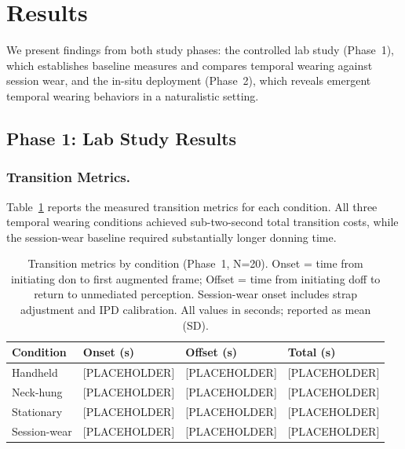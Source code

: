 
\section{Results}

We present findings from both study phases: the controlled lab study (Phase~1), which establishes baseline measures and compares temporal wearing against session wear, and the in-situ deployment (Phase~2), which reveals emergent temporal wearing behaviors in a naturalistic setting.

\subsection{Phase 1: Lab Study Results}

\subsubsection{Transition Metrics.}
Table~\ref{tab:lab-transition} reports the measured transition metrics for each condition. All three temporal wearing conditions achieved sub-two-second total transition costs, while the session-wear baseline required substantially longer donning time.

\begin{table}[t]
\centering
\caption{Transition metrics by condition (Phase~1, N=20). Onset = time from initiating don to first augmented frame; Offset = time from initiating doff to return to unmediated perception. Session-wear onset includes strap adjustment and IPD calibration. All values in seconds; reported as mean (SD).}
\label{tab:lab-transition}
\begin{tabular}{p{2.2cm} p{1.8cm} p{1.8cm} p{2cm}}
\toprule
\textbf{Condition} & \textbf{Onset (s)} & \textbf{Offset (s)} & \textbf{Total (s)} \\
\midrule
Handheld & [PLACEHOLDER] & [PLACEHOLDER] & [PLACEHOLDER] \\
Neck-hung & [PLACEHOLDER] & [PLACEHOLDER] & [PLACEHOLDER] \\
Stationary & [PLACEHOLDER] & [PLACEHOLDER] & [PLACEHOLDER] \\
Session-wear & [PLACEHOLDER] & [PLACEHOLDER] & [PLACEHOLDER] \\
\bottomrule
\end{tabular}
\end{table}


